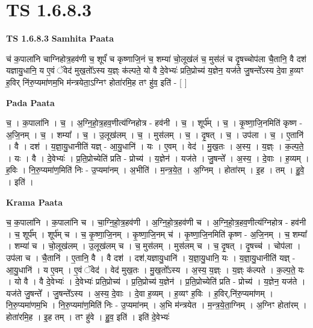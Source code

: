 \documentclass[17pt]{extarticle}
\begin{document}
\section*{ TS 1.6.8.3 }

\textbf{TS 1.6.8.3 } \newline
\textbf{Samhita Paata} \newline

च॑ क॒पाला॑नि चाग्निहोत्र॒हव॑णी च॒ शूर्पं॑ च कृष्णाजि॒नं च॒ शम्या॑ चो॒लूख॑लं च॒ मुस॑लं च दृ॒षच्चोप॑ला चै॒तानि॒ वै दश॑ यज्ञायु॒धानि॒ य ए॒वं ॅवेद॑ मुख॒तो᳚ऽस्य य॒ज्ञ्ः क॑ल्पते॒ यो वै दे॒वेभ्यः॑ प्रति॒प्रोच्य॑ य॒ज्ञेन॒ यज॑ते जु॒षन्ते᳚ऽस्य दे॒वा ह॒व्यꣳ ह॒विर् नि॑रु॒प्यमा॑णम॒भि म॑न्त्रयेता॒ऽग्निꣳ होता॑रमि॒ह तꣳ हु॑व॒ इति॑ - [ ] \newline

\textbf{Pada Paata} \newline

च॒ । क॒पाला॑नि । च॒ । अ॒ग्नि॒हो॒त्र॒हव॒णीत्य॑ग्निहोत्र - हव॑नी । च॒ । शूर्प᳚म् । च॒ । कृ॒ष्णा॒जि॒नमिति॑ कृष्ण - अ॒जि॒नम् । च॒ । शम्या᳚ । च॒ । उ॒लूख॑लम् । च॒ । मुस॑लम् । च॒ । दृ॒षत् । च॒ । उप॑ला । च॒ । ए॒तानि॑ । वै । दश॑ । य॒ज्ञा॒यु॒धानीति॑ यज्ञ् - आ॒यु॒धानि॑ । यः । ए॒वम् । वेद॑ । मु॒ख॒तः । अ॒स्य॒ । य॒ज्ञ्ः । क॒ल्प॒ते॒ । यः । वै । दे॒वेभ्यः॑ । प्र॒ति॒प्रोच्येति॑ प्रति - प्रोच्य॑ । य॒ज्ञेन॑ । यज॑ते । जु॒षन्ते᳚ । अ॒स्य॒ । दे॒वाः । ह॒व्यम् । ह॒विः । नि॒रु॒प्यमा॑ण॒मिति॑ निः - उ॒प्यमा॑नम् । अ॒भीति॑ । म॒न्त्र॒ये॒त॒ । अ॒ग्निम् । होता॑रम् । इ॒ह । तम् । हु॒वे॒ । इति॑ ।  \newline


\textbf{Krama Paata} \newline

च॒ क॒पाला॑नि । क॒पाला॑नि च । चा॒ग्नि॒हो॒त्र॒हव॑णी । अ॒ग्नि॒हो॒त्र॒हव॑णी च । अ॒ग्नि॒हो॒त्र॒हव॒णीत्य॑ग्निहोत्र - हव॑नी । च॒ शूर्प᳚म् । शूर्प॑म् च । च॒ कृ॒ष्णा॒जि॒नम् । कृ॒ष्णा॒जि॒नम् च॑ । कृ॒ष्णा॒जि॒नमिति॑ कृष्ण - अ॒जि॒नम् । च॒ शम्या᳚ । शम्या॑ च । चो॒लूख॑लम् । उ॒लूख॑लम् च । च॒ मुस॑लम् । मुस॑लम् च । च॒ दृ॒षत् । दृ॒षच्च॑ । चोप॑ला । उप॑ला च । चै॒तानि॑ । ए॒तानि॒ वै । वै दश॑ । दश॑,यज्ञायु॒धानि॑ । य॒ज्ञा॒यु॒धानि॒ यः । य॒ज्ञा॒यु॒धानीति॑ यज्ञ् - आ॒यु॒धानि॑ । य ए॒वम् । ए॒वं ॅवेद॑ । वेद॑ मुख॒तः । मु॒ख॒तो᳚ऽस्य । अ॒स्य॒ य॒ज्ञ्ः । य॒ज्ञ्ः क॑ल्पते । क॒ल्प॒ते॒ यः । यो वै । वै दे॒वेभ्यः॑ । दे॒वेभ्यः॑ प्रति॒प्रोच्य॑ । प्र॒ति॒प्रोच्य॑ य॒ज्ञेन॑ । प्र॒ति॒प्रोच्येति॑ प्रति - प्रोच्य॑ । य॒ज्ञेन॒ यज॑ते । यज॑ते जु॒षन्ते᳚ । जु॒षन्ते᳚ऽस्य । अ॒स्य॒ दे॒वाः । दे॒वा ह॒व्यम् । ह॒व्यꣳ ह॒विः । ह॒विर्,नि॑रु॒प्यमा॑णम् । नि॒रु॒प्यमा॑णम॒भि । नि॒रु॒प्यमा॑ण॒मिति॑ निः - उ॒प्यमा॑नम् । अ॒भि म॑न्त्रयेत । म॒न्त्र॒ये॒ता॒ग्निम् । अ॒ग्निꣳ होता॑रम् । होता॑रमि॒ह । इ॒ह तम् । तꣳ हु॑वे । हु॒व॒ इति॑ । इति॑ दे॒वेभ्यः॑ \newline
\end{document}
